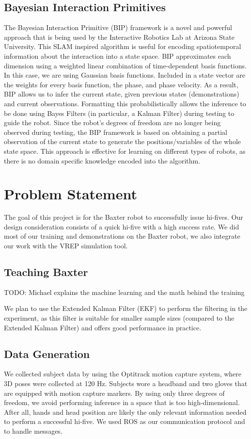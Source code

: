 \documentclass[letterpaper, 10 pt, conference]{ieeeconf}  %
\begin{document}
\subsection{Bayesian Interaction Primitives}
The Bayesian Interaction Primitive (BIP) framework is a novel and powerful approach that is being used by the Interactive Robotics Lab at Arizona State University. This SLAM inspired algorithm is useful for encoding spatiotemporal information about the interaction into a state space. BIP approximates each dimension using a weighted linear combination of time-dependent basis functions. In this case, we are using Gaussian basis functions. Included in a state vector are the weights for every basis function, the phase, and phase velocity. As a result, BIP allows us to infer the current state, given previous states (demonstrations) and current observations. Formatting this probabilistically allows the inference to be done using Bayes Filters (in particular, a Kalman Filter) during testing to guide the robot. Since the robot's degrees of freedom are no longer being observed during testing, the BIP framework is based on obtaining a partial observation of the current state to generate the positions/variables of the whole state space. This approach is effective for learning on different types of robots, as there is no domain specific knowledge encoded into the algorithm.

\section{Problem Statement}
The goal of this project is for the Baxter robot to successfully issue hi-fives. Our design consideration consists of a quick hi-five with a high success rate. We did most of our training and demonstrations on the Baxter robot, we also integrate our work with the VREP simulation tool.

\subsection{Teaching Baxter}

TODO: Michael explains the machine learning and the math behind the training 

We plan to use the Extended Kalman Filter (EKF) to perform the filtering in the experiment, as this filter is suitable for smaller sample sizes (compared to the Extended Kalman Filter) and offers good performance in practice.

\subsection{Data Generation}
We collected subject data by using the Optitrack motion capture system, where 3D poses were collected at 120 Hz. Subjects wore a headband and two gloves that are equipped with motion capture markers. By using only three degrees of freedom, we avoid performing inference in a space that is too high-dimensional. After all, hands and head position are likely the only relevant information needed to perform a successful hi-five. We used ROS as our communication protocol and to handle messages.
\end{document}
